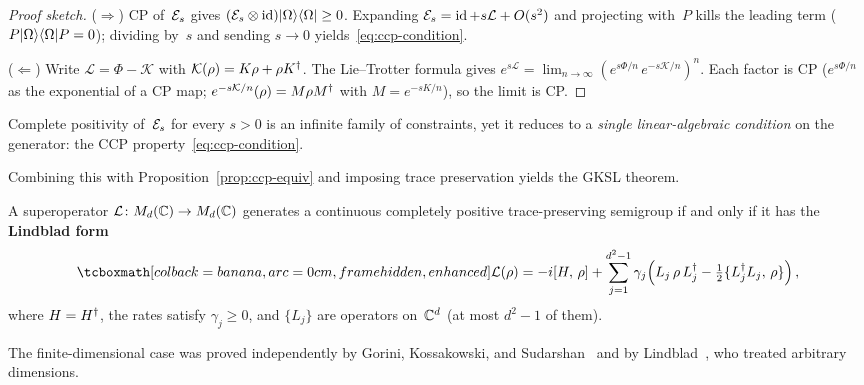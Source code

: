 \begin{proof}[Proof sketch]
  ($\Rightarrow$) CP of~$\mathcal{E}_s$ gives
  $(\mathcal{E}_s \otimes \operatorname{id})\lvert \Omega \rangle\langle \Omega \rvert \geq 0$.  Expanding
  $\mathcal{E}_s = \operatorname{id} + s\mathcal{L} + O(s^2)$ and projecting with~$P$
  kills the leading term ($P\lvert \Omega \rangle\langle \Omega \rvert P = 0$);
  dividing by~$s$ and sending $s\to 0$ yields~\eqref{eq:ccp-condition}.

  ($\Leftarrow$) Write $\mathcal{L} = \Phi - \mathcal{K}$ with
  $\mathcal{K}(\rho) = K\rho + \rho K^\dagger$.  The Lie--Trotter
  formula gives
  $e^{s\mathcal{L}} = \lim_{n\to\infty}
  (e^{s\Phi/n}\,e^{-s\mathcal{K}/n})^n$.
  Each factor is CP ($e^{s\Phi/n}$ as the exponential of a CP map;
  $e^{-s\mathcal{K}/n}(\rho) = M\rho M^\dagger$ with $M=e^{-sK/n}$),
  so the limit is CP.
\end{proof}

\begin{keyresult}
  Complete positivity of~$\mathcal{E}_s$ for every $s > 0$ is an infinite
  family of constraints, yet it reduces to a \emph{single
  linear-algebraic condition} on the generator: the CCP
  property~\eqref{eq:ccp-condition}.
\end{keyresult}

Combining this with Proposition~\ref{prop:ccp-equiv} and imposing
trace preservation yields the GKSL theorem.

\begin{theorem}%
\label{thm:gksl}
  A superoperator $\mathcal{L}\colon M_{d}(\mathbb{C})\to M_{d}(\mathbb{C})$ generates a
  continuous completely positive trace-preserving semigroup if and
  only if it has the \textbf{Lindblad form}
  \begin{equation}\label{eq:gksl}
    \eqbox{\mathcal{L}(\rho)
    = -i[H,\,\rho]
      + \sum_{j=1}^{d^2-1} \gamma_j\Bigl(
        L_j\,\rho\, L_j^\adj
        - \tfrac{1}{2}\{L_j^\adj L_j,\,\rho\}\Bigr)}\,,
  \end{equation}
  where $H = H^\dagger$, the rates satisfy $\gamma_j \geq 0$, and
  $\{L_j\}$ are operators on~$\mathbb{C}^d$ (at most $d^2 - 1$ of them).
\end{theorem}

\begin{historical}
  The finite-dimensional case was proved independently by Gorini,
  Kossakowski, and Sudarshan~\cite{GKS76} and by
  Lindblad~\cite{Lindblad76}, who treated arbitrary dimensions.
\end{historical}


